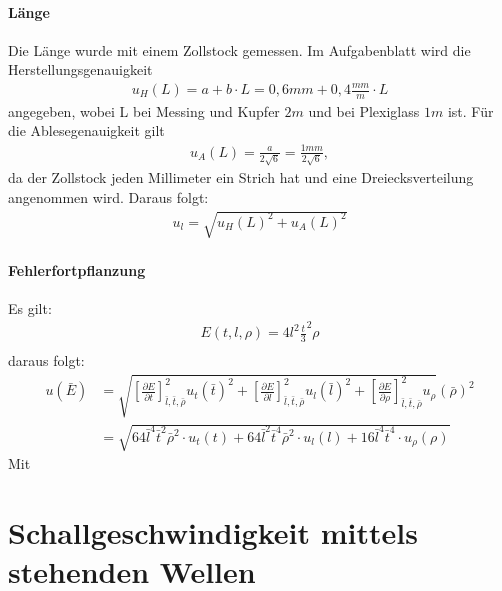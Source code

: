 \documentclass[11pt, a4paper]{article}
\begin{document}
    \paragraph{Länge}
    Die Länge wurde mit einem Zollstock gemessen. Im Aufgabenblatt wird die Herstellungsgenauigkeit
    \begin{align}
        u_H(L) = a+b \cdot L = 0,6mm + 0,4\frac{mm}{m} \cdot L
    \end{align}
    angegeben, wobei L bei Messing und Kupfer $2m$ und bei Plexiglass $1m$ ist.
    Für die Ablesegenauigkeit gilt
    \begin{align}
        u_A(L) = \frac{a}{2\sqrt{6}} = \frac{1mm}{2\sqrt{6}},
    \end{align}
    da der Zollstock jeden Millimeter ein Strich hat und eine Dreiecksverteilung angenommen wird.
    Daraus folgt:
    \begin{align}
        u_l = \sqrt{u_H(L)^2 + u_A(L)^2}
    \end{align}

    \paragraph{Fehlerfortpflanzung}
    Es gilt:
    \begin{align}
        E(t, l, \rho ) = 4l^2 \frac{t}{3}^2 \rho \\
    \end{align}
    daraus folgt:
    \begin{align}
        u(\bar{E}) &= \sqrt{\left[\frac{\partial E}{\partial t}\right]^2_{\bar{l}, \bar{t}, \bar{\rho}} u_{t}(\bar{t})^2 +
        \left[\frac{\partial E}{\partial l}\right]^2_{\bar{l}, \bar{t}, \bar{\rho}} u_{l}(\bar{l})^2 +
        \left[\frac{\partial E}{\partial \rho}\right]^2_{\bar{l}, \bar{t}, \bar{\rho}} u_{\rho}}(\bar{\rho})^2 \nonumber \\
        &= \sqrt{64 \bar{l}^4\bar{t}^2 \bar{\rho}^2 \cdot u_t(t) +
        64 \bar{l}^2 \bar{t}^4 \bar{\rho}^2 \cdot u_l(l) +
        16 \bar{l}^4\bar{t}^4 \cdot u_{\rho}(\rho)
        } \nonumber
    \end{align}
    Mit

    \section{Schallgeschwindigkeit mittels stehenden Wellen}
\end{document}
